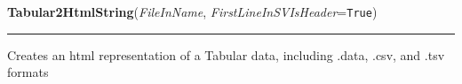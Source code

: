     \vspace{0.5ex}

\hspace{.8\funcindent}\begin{boxedminipage}{\funcwidth}

    \raggedright \textbf{Tabular2HtmlString}(\textit{FileInName}, \textit{FirstLineInSVIsHeader}={\tt True})

    \vspace{-1.5ex}

    \rule{\textwidth}{0.5\fboxrule}
\setlength{\parskip}{2ex}
    Creates an html representation of a Tabular data, including .data, 
    .csv, and .tsv formats

\setlength{\parskip}{1ex}
    \end{boxedminipage}

